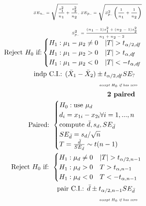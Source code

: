 \documentclass{article}
\newcommand{\note}[1]{\tiny\smash{\textit{#1}}}
\begin{document}
\begin{minipage}{0.48\textwidth}
	\begin{align*}
		\note{$SE_{\text{u..}} = \sqrt{\frac{s_1^2}{n_1} + \frac{s_2^2}{n_2}}$, }
		\note{$SE_{\text{p..}} = \sqrt{S^2_{\text{p..}}\left(\frac{1}{n_1} + \frac{1}{n_2}\right)}$}\\~\\
		\note{$S^2_{\text{p..}} = \frac{(n_1 - 1)s_1^2 + (n_2 - 1)s_2^2}{n_1 + n_2 - 2} \quad$}\\
		\text{Reject $H_0$ if:}
		\begin{cases}
			H_1 : \mu_1 - \mu_2 \ne 0 & |T| > t_{\alpha / 2 , df}
			\\
			H_1 : \mu_1 - \mu_2 > 0 & |T| > t_{\alpha , df}
			\\
			H_1 : \mu_1 - \mu_2 < 0 & |T| < - t_{\alpha , df}
		\end{cases} \\
		\text{indp C.I.: } (\bar{X}_1 - \bar{X}_2) \pm t_{\alpha / 2 , df} SE_? \quad \\
		\note{accept $H_0$ if has zero} \quad \\
		\textbf{2 paired} \quad \\
		\text{Paired: }
		\begin{cases}
			H_0 : \text{use } \mu_d \\
			d_i = x_{1i} - x_{2i} \forall i=1,...,n \\
			\text{compute } \bar{d}, s_d, SE_{\bar{d}} \\
			SE_{\bar{d}} = s_d / \sqrt{n} \\
			T = \frac{\bar{d}}{SE_{\bar{d}}} \sim t(n-1)
		\end{cases} \\
		\text{Reject $H_0$ if: }
		\begin{cases}
			H_1 : \mu_d \ne 0 & |T| > t_{\alpha / 2 , n - 1}
			\\
			H_1 : \mu_d > 0 & T > t_{\alpha , n - 1}
			\\
			H_1 : \mu_d < 0 & T < - t_{\alpha , n - 1}
		\end{cases} \\
		\text{pair C.I.: } \bar{d} \pm t_{\alpha / 2, n-1} SE_{\bar{d}} \quad \\
		\note{accept $H_0$ if has zero} \quad \\
	\end{align*}
\end{minipage}
\newpage
\end{document}
